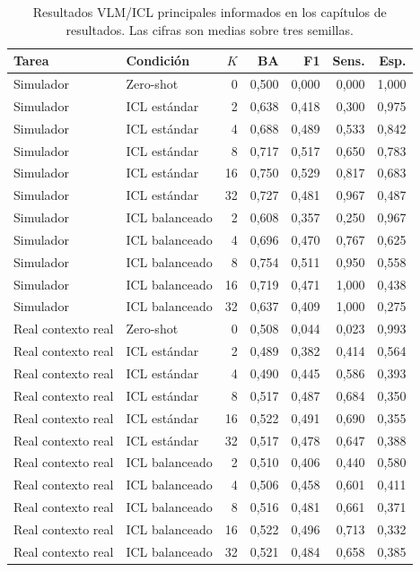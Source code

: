 \begin{table}[H]
  \centering
  \footnotesize
  \begin{tabular}{llrrrrr}
    \toprule
    Tarea & Condición & \(K\) & BA & F1 & Sens. & Esp. \\
    \midrule
    Simulador & Zero-shot & 0  & 0,500 & 0,000 & 0,000 & 1,000 \\
    Simulador & ICL estándar & 2  & 0,638 & 0,418 & 0,300 & 0,975 \\
    Simulador & ICL estándar & 4  & 0,688 & 0,489 & 0,533 & 0,842 \\
    Simulador & ICL estándar & 8  & 0,717 & 0,517 & 0,650 & 0,783 \\
    Simulador & ICL estándar & 16 & 0,750 & 0,529 & 0,817 & 0,683 \\
    Simulador & ICL estándar & 32 & 0,727 & 0,481 & 0,967 & 0,487 \\
    Simulador & ICL balanceado & 2  & 0,608 & 0,357 & 0,250 & 0,967 \\
    Simulador & ICL balanceado & 4  & 0,696 & 0,470 & 0,767 & 0,625 \\
    Simulador & ICL balanceado & 8  & 0,754 & 0,511 & 0,950 & 0,558 \\
    Simulador & ICL balanceado & 16 & 0,719 & 0,471 & 1,000 & 0,438 \\
    Simulador & ICL balanceado & 32 & 0,637 & 0,409 & 1,000 & 0,275 \\
    Real contexto real & Zero-shot & 0  & 0,508 & 0,044 & 0,023 & 0,993 \\
    Real contexto real & ICL estándar & 2  & 0,489 & 0,382 & 0,414 & 0,564 \\
    Real contexto real & ICL estándar & 4  & 0,490 & 0,445 & 0,586 & 0,393 \\
    Real contexto real & ICL estándar & 8  & 0,517 & 0,487 & 0,684 & 0,350 \\
    Real contexto real & ICL estándar & 16 & 0,522 & 0,491 & 0,690 & 0,355 \\
    Real contexto real & ICL estándar & 32 & 0,517 & 0,478 & 0,647 & 0,388 \\
    Real contexto real & ICL balanceado & 2  & 0,510 & 0,406 & 0,440 & 0,580 \\
    Real contexto real & ICL balanceado & 4  & 0,506 & 0,458 & 0,601 & 0,411 \\
    Real contexto real & ICL balanceado & 8  & 0,516 & 0,481 & 0,661 & 0,371 \\
    Real contexto real & ICL balanceado & 16 & 0,522 & 0,496 & 0,713 & 0,332 \\
    Real contexto real & ICL balanceado & 32 & 0,521 & 0,484 & 0,658 & 0,385 \\
    \bottomrule
  \end{tabular}
  \caption{Resultados VLM/ICL principales informados en los capítulos de resultados. Las cifras son medias sobre tres semillas.}
  \label{tab:app_vlm_completo}
\end{table}

